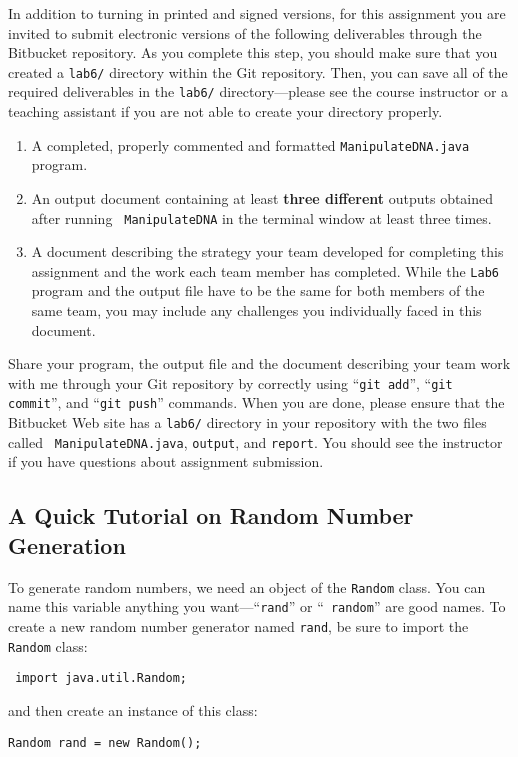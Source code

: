 In addition to turning in printed and signed versions, for this assignment you are invited to submit electronic versions
of the following deliverables through the Bitbucket repository. As you complete this step, you should make sure that you
created a {\tt lab6/} directory within the Git repository.  Then, you can save all of the required deliverables in the
{\tt lab6/} directory---please see the course instructor or a teaching assistant if you are not able to create your
directory properly.

\begin{enumerate}

  \item A completed, properly commented and formatted {\tt ManipulateDNA.java} program.

  \item An output document containing at least \textbf{three different} outputs obtained after running {\tt
    ManipulateDNA} in the terminal window at least three times.

  \item A document describing the strategy your team developed for completing this assignment and the work each
    team member has completed. While the {\tt Lab6} program and the output file have to be the same for both
    members of the same team, you may include any challenges you individually faced in this document.

\end{enumerate}

\vspace{-0.1in}

Share your program, the output file and the document describing your team work with me through your Git repository by
correctly using ``{\tt git add}'', ``{\tt git commit}'', and ``{\tt git push}'' commands. When you are done, please
ensure that the Bitbucket Web site has a {\tt lab6/} directory in your repository with the two files called {\tt
ManipulateDNA.java}, {\tt output}, and {\tt report}. You should see the instructor if you have questions about
assignment submission.

\vspace{-0.05in}
\subsection*{A Quick Tutorial on Random Number Generation}
\vspace{-0.05in}
To generate random numbers, we need an object of the {\tt Random} class.
You can name this variable anything you want---``{\tt rand}'' or ``{\tt
random}'' are good names. To create a new random number generator
named {\tt rand}, be sure to import the {\tt Random} class:
\begin{center}
\verb$ import java.util.Random;$
\end{center}
and then create an instance of this class:
\begin{center}
\verb$Random rand = new Random();$
\end{center}

